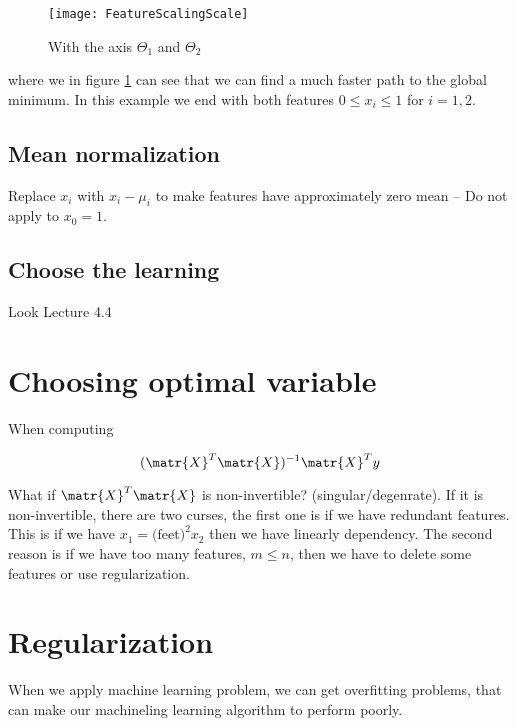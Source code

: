 \begin{figure}[H]
  \centering
  \texttt{[image: FeatureScalingScale]}
  \caption{With the axis $\Theta_1$ and $\Theta_2$}\label{fig:app:FeatureScalingScale}
\end{figure}

where we in figure \ref{fig:app:FeatureScalingScale} can see that we can find a much faster path to the global minimum.
In this example we end with both features $0\leq x_i \leq 1$ for $i=1,2$.

\subsection{Mean normalization}

Replace $x_i$ with $x_i - \mu_i$ to make features have approximately zero mean -- Do not apply to $x_0=1$.

\subsection{Choose the learning}

Look Lecture 4.4

\section{Choosing optimal variable}

When computing

\begin{equation}\label{fig:app:normalequationexample}
  (\matr{X}^T\matr{X})^{-1}\matr{X}^Ty
\end{equation}

What if $\matr{X}^T\matr{X}$ is non-invertible? (singular/degenrate). If it is non-invertible, there are two curses, the first one is if we have redundant features.
This is if we have $x_1 = \text{(feet)}^2x_2$ then we have linearly dependency.
The second reason is if we have too many features, $m\leq n$, then we have to delete some features or use regularization.

\section{Regularization}

When we apply machine learning problem, we can get overfitting problems, that can make our machineling learning algorithm to perform poorly.

